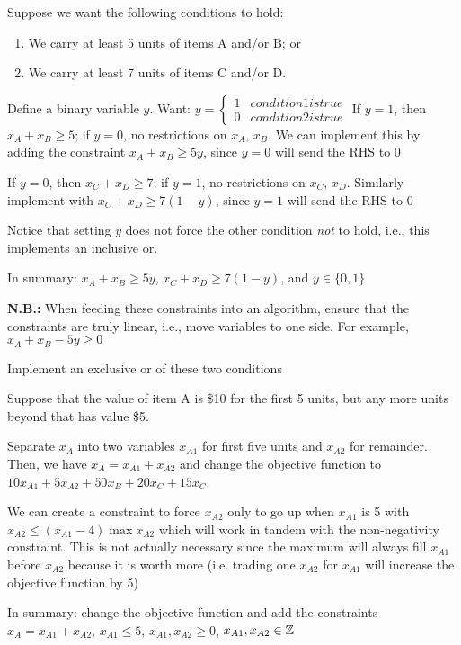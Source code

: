\documentclass[class=co250,tikz,notes]{agony}
\begin{document}
\begin{example}
  Suppose we want the following conditions to hold:
  \begin{enumerate}[1.,nosep]
    \item We carry at least 5 units of items A and/or B; or
    \item We carry at least 7 units of items C and/or D.
  \end{enumerate}
\end{example}
\begin{sol}
  Define a binary variable $y$. Want: $y = \begin{cases*}1&condition 1 is true\\0&condition 2 is true\end{cases*}$
  If $y = 1$, then $x_A + x_B \geq 5$; if $y = 0$, no restrictions on $x_A$, $x_B$. We can implement this by adding the constraint $x_A + x_B \geq 5y$, since $y = 0$ will send the RHS to $0$

  If $y = 0$, then $x_C + x_D \geq 7$; if $y = 1$, no restrictions on $x_C$, $x_D$. Similarly implement with $x_C + x_D \geq 7(1-y)$, since $y=1$ will send the RHS to $0$

  Notice that setting $y$ does not force the other condition \emph{not} to hold, i.e., this implements an inclusive or.

  In summary: $x_A + x_B \geq 5y$, $x_C + x_D \geq 7(1-y)$, and $y \in \{0,1\}$

  \textbf{N.B.:} When feeding these constraints into an algorithm, ensure that the constraints are truly linear, i.e., move variables to one side. For example, $x_A + x_B - 5y \geq 0$
\end{sol}

\begin{xca}
  Implement an exclusive or of these two conditions
\end{xca}

\begin{example}
  Suppose that the value of item A is \$10 for the first 5 units, but any more units beyond that has value \$5.
\end{example}
\begin{sol}
  Separate $x_A$ into two variables $x_{A1}$ for first five units and $x_{A2}$ for remainder.
  Then, we have $x_A=x_{A1}+x_{A2}$ and change the objective function to $10x_{A1} + 5x_{A2} + 50x_B + 20x_C + 15x_C$.

  We can create a constraint to force $x_{A2}$ only to go up when $x_{A1}$ is 5 with $x_{A2} \leq (x_{A1} - 4)\max x_{A2}$ which will work in tandem with the non-negativity constraint. This is not actually necessary since the maximum will always fill $x_{A1}$ before $x_{A2}$ because it is worth more (i.e. trading one $x_{A2}$ for $x_{A1}$ will increase the objective function by 5)

  In summary: change the objective function and add the constraints $x_A = x_{A1} + x_{A2}$, $x_{A1} \leq 5$, $x_{A1},x_{A2} \geq 0$, $x_{A1}, x_{A2} \in \mathbb{Z}$
\end{sol}
\end{document}

